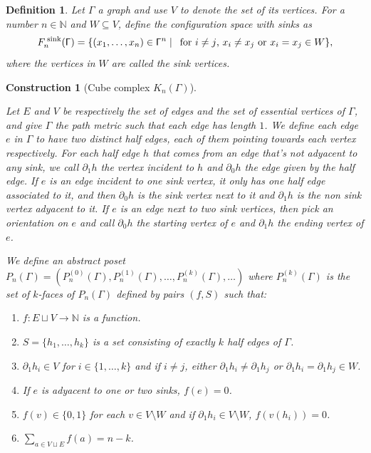 \documentclass{article}
\newcommand{\bbN}{\mathbb{N}}
\newtheorem{construction}{Construction}
\newtheorem*{definition*}{Definition}
\begin{document}
\justifying

\begin{definition*}
    Let $\mathsf{\Gamma}$ a graph and use $V$ to denote the set of its vertices. For a number $n\in \mathbb{N}$ and $W\subseteq V$, define the \emph{configuration space with sinks} as \[F_n^{\text{\hspace{2pt}sink}}(\mathsf{\Gamma})=\{(x_1,\dots, x_n)\in \mathsf{\Gamma}^n \mid \hspace{5pt}  \text{for $i\neq j$, $x_i\neq x_j$ or $x_i =x_j\in W$}\},\]
    where the vertices in $W$ are called the \emph{sink vertices}.
\end{definition*} 
\begin{construction}[Cube complex $K_n(\mathsf{\Gamma})$]\label{const} \hfill 
    \vspace{5pt}

  Let $E$ and $V$ be respectively the set of edges and the set of essential vertices  of $\mathsf{\Gamma}$, and give $\mathsf{\Gamma}$ the path metric such that each edge has length $1$. We define each edge $e$ in $\mathsf{\Gamma}$ to have two distinct \emph{half edges}, each of them pointing towards each vertex respectively. For each half edge $h$ that comes from an edge that's not adyacent to any sink, we call $\partial_1 h$ the vertex incident to $h$ and $\partial_0 h$ the edge given by the half edge. If $e$ is an edge incident to one sink vertex, it only has one half edge associated to it, and then $\partial_0h$ is the sink vertex next to it and $\partial_1h$ is the non sink vertex adyacent to it. If $e$ is an edge next to two sink vertices, then pick an orientation on $e$ and call $\partial_0h$ the starting vertex of $e$ and $\partial_1h$ the ending vertex of $e$. 

 We define an abstract poset $P_n(\mathsf{\Gamma})= (P_n^{(0)}(\mathsf{\Gamma}), P_n^{(1)}(\mathsf{\Gamma}), \dots , P_n^{(k)}(\mathsf{\Gamma}), \dots)$ where $P_n^{(k)}(\mathsf{\Gamma})$ is the set of $k$-faces of $P_n(\mathsf{\Gamma})$ defined by pairs $(f, S)$ such that:
 \begin{enumerate}
    \item[(a)] $f: E\sqcup V \to \bbN$ is a function.
    \item[(b)] $S=\{h_1, \dots, h_k\}$ is a set consisting of exactly $k$ half edges of $\mathsf{\Gamma}$.
    \item[(c)] $\partial_1h_i\in V$ for $i\in \{1, \dots, k\}$ and if $i\neq j$, either $\partial_1 h_i\neq \partial_1 h_j$ or $\partial_1h_i=\partial_1h_j\in W$.
    \item[(d)] If $e$ is adyacent to one or two sinks, $f(e)=0$.
    \item[(e)] $f(v)\in \{0, 1\}$ for each $v\in V \setminus W$ and if $\partial_1 h_i\in V\setminus W$, $f(v(h_i))=0$. 
    \item[(f)] $\sum_{a\in V\sqcup E }f(a)= n-k$.
 \end{enumerate}


\end{construction}
\end{document}

